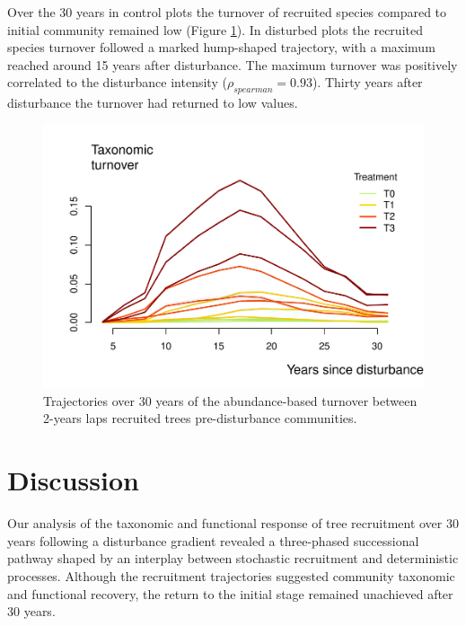 \documentclass[fleqn,10pt]{ArtEcoFoG} %
\begin{document}
Over the 30 years in control plots the turnover of recruited species
compared to initial community remained low (Figure \ref{fig:Turnover}).
In disturbed plots the recruited species turnover followed a marked
hump-shaped trajectory, with a maximum reached around 15 years after
disturbance. The maximum turnover was positively correlated to the
disturbance intensity (\(\rho_{spearman}=0.93\)). Thirty years after
disturbance the turnover had returned to low values.

\begin{figure}

{\centering \includegraphics[width=1\linewidth]{RecruitmentTrajectories_files/figure-latex/Turnover-1} 

}

\caption{Trajectories over 30 years of the abundance-based turnover between 2-years laps recruited trees pre-disturbance communities.}\label{fig:Turnover}
\end{figure}

\section{Discussion}\label{discussion}

\color{red} Our analysis of the taxonomic and functional response of
tree recruitment over 30 years following a disturbance gradient revealed
a three-phased successional pathway shaped by an interplay between
stochastic recruitment and deterministic processes. Although the
recruitment trajectories suggested community taxonomic and functional
recovery, the return to the initial stage remained unachieved after 30
years.
\end{document}
